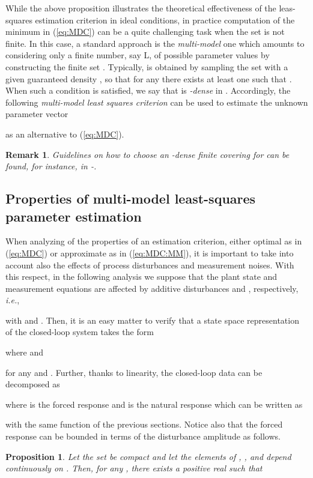 \documentclass[letterpaper, 10 pt, conference]{ieeetran}
\def\qedp{\hspace*{\fill}~{\tiny }}
\newtheorem{itproposition}{Proposition}
\newtheorem{itremark}{Remark}
\newenvironment{proposition}{\begin{itproposition}\rm}{\end{itproposition}}
\newenvironment{remark}{\begin{itremark}\rm}{\end{itremark}}
\begin{document}
While the above proposition illustrates the theoretical effectiveness of the leas-squares estimation criterion in ideal conditions, in practice computation of the minimum
in (\ref{eq:MDC}) can be a quite challenging task when the set  is not finite. In this case, a standard approach is the {\em multi-model} one which amounts to considering only a finite
number, say L, of possible parameter values by constructing the finite set 
. 
Typically,  is obtained by sampling the set  with a given guaranteed density , so that for any  there exists
at least one  such that . When such a condition is satisfied, we say that  is {\em -dense} in .
Accordingly, the following {\em multi-model least squares criterion}  can be used to estimate the unknown parameter vector 

as an alternative to (\ref{eq:MDC}). 

\begin{remark}
Guidelines on how to choose an {\em -dense} finite covering for 
can be found, for instance, in \cite{debruye2}-\nocite{baldi2}\cite{Buchstaller}. \qedp
\end{remark}

\subsection{Properties of multi-model least-squares parameter estimation}

When analyzing of the properties of an estimation criterion, either optimal as in (\ref{eq:MDC}) or approximate as in (\ref{eq:MDC:MM}),
it is important to take into account also the effects of process disturbances and measurement noises. With this respect, in the following analysis we suppose that the
plant state and measurement equations are
affected by additive disturbances  and ,
 respectively, \emph{i.e.},

with  and .
Then, it is an easy matter to verify that a state space
representation of the closed-loop system 
 takes the form

where  and

for any  and .
Further, thanks to linearity, the
closed-loop data  can be decomposed as

where  is the forced response and  is the natural response
which can be written as

with   the same function of the previous sections.
Notice also that the forced response  can be bounded in terms of the disturbance amplitude as follows. 

\begin{proposition}
Let the set  be compact and let the elements of , , and  depend continuously on .
Then, for any , there exists a positive real  such that

\qedp
\end{proposition}
\end{document}
